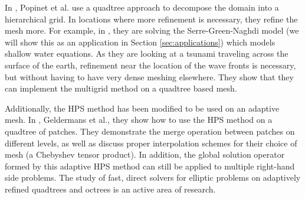 In \cite{popinet2015quadtree}, Popinet et al. use a quadtree approach to decompose the domain into a hierarchical grid. In locations where more refinement is necessary, they refine the mesh more. For example, in \cite{popinet2015quadtree}, they are solving the Serre-Green-Naghdi model (we will show this as an application in Section \ref{sec:applications}) which models shallow water equations. As they are looking at a tsunami traveling across the surface of the earth, refinement near the location of the wave fronts is necessary, but without having to have very dense meshing elsewhere. They show that they can implement the multigrid method on a quadtree based mesh.

Additionally, the HPS method has been modified to be used on an adaptive mesh. In \cite{geldermans2019adaptive}, Geldermans et al., they show how to use the HPS method on a quadtree of patches. They demonstrate the merge operation between patches on different levels, as well as discuss proper interpolation schemes for their choice of mesh (a Chebyshev tensor product). In addition, the global solution operator formed by this adaptive HPS method can still be applied to multiple right-hand side problems. The study of fast, direct solvers for elliptic problems on adaptively refined quadtrees and octrees is an active area of research.

